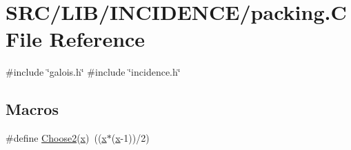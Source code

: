 \hypertarget{_l_i_b_2_i_n_c_i_d_e_n_c_e_2packing_8_c}{}\section{S\+R\+C/\+L\+I\+B/\+I\+N\+C\+I\+D\+E\+N\+C\+E/packing.C File Reference}
\label{_l_i_b_2_i_n_c_i_d_e_n_c_e_2packing_8_c}
{\ttfamily \#include \char`\"{}galois.\+h\char`\"{}}\newline
{\ttfamily \#include \char`\"{}incidence.\+h\char`\"{}}\newline
\subsection*{Macros}
\begin{DoxyCompactItemize}
\item 
\#define \mbox{\hyperlink{_l_i_b_2_i_n_c_i_d_e_n_c_e_2packing_8_c_a4d54c9f3209eb85acd1df7988bef9c41}{Choose2}}(\mbox{\hyperlink{alphabet2_8_c_a6150e0515f7202e2fb518f7206ed97dc}{x}})~((\mbox{\hyperlink{alphabet2_8_c_a6150e0515f7202e2fb518f7206ed97dc}{x}}$\ast$(\mbox{\hyperlink{alphabet2_8_c_a6150e0515f7202e2fb518f7206ed97dc}{x}}-\/1))/2)
\end{DoxyCompactItemize}
